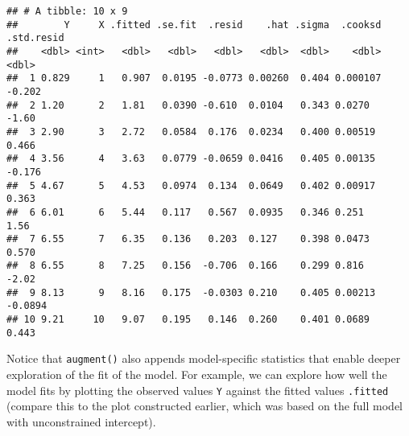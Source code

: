 \documentclass[
]{book}
\newenvironment{Shaded}{\begin{snugshade}}{\end{snugshade}}
\newcommand{\DataTypeTok}[1]{\textcolor[rgb]{0.13,0.29,0.53}{#1}}
\newcommand{\FloatTok}[1]{\textcolor[rgb]{0.00,0.00,0.81}{#1}}
\newcommand{\KeywordTok}[1]{\textcolor[rgb]{0.13,0.29,0.53}{\textbf{#1}}}
\newcommand{\NormalTok}[1]{#1}
\newcommand{\OperatorTok}[1]{\textcolor[rgb]{0.81,0.36,0.00}{\textbf{#1}}}
\newcommand{\StringTok}[1]{\textcolor[rgb]{0.31,0.60,0.02}{#1}}
\begin{document}
\begin{verbatim}
## # A tibble: 10 x 9
##        Y     X .fitted .se.fit  .resid    .hat .sigma  .cooksd .std.resid
##    <dbl> <int>   <dbl>   <dbl>   <dbl>   <dbl>  <dbl>    <dbl>      <dbl>
##  1 0.829     1   0.907  0.0195 -0.0773 0.00260  0.404 0.000107    -0.202 
##  2 1.20      2   1.81   0.0390 -0.610  0.0104   0.343 0.0270      -1.60  
##  3 2.90      3   2.72   0.0584  0.176  0.0234   0.400 0.00519      0.466 
##  4 3.56      4   3.63   0.0779 -0.0659 0.0416   0.405 0.00135     -0.176 
##  5 4.67      5   4.53   0.0974  0.134  0.0649   0.402 0.00917      0.363 
##  6 6.01      6   5.44   0.117   0.567  0.0935   0.346 0.251        1.56  
##  7 6.55      7   6.35   0.136   0.203  0.127    0.398 0.0473       0.570 
##  8 6.55      8   7.25   0.156  -0.706  0.166    0.299 0.816       -2.02  
##  9 8.13      9   8.16   0.175  -0.0303 0.210    0.405 0.00213     -0.0894
## 10 9.21     10   9.07   0.195   0.146  0.260    0.401 0.0689       0.443
\end{verbatim}

Notice that \texttt{augment()} also appends model-specific statistics that enable deeper exploration of the fit of the model. For example, we can explore how well the model fits by plotting the observed values \texttt{Y} against the fitted values \texttt{.fitted} (compare this to the plot constructed earlier, which was based on the full model with unconstrained intercept).

\begin{Shaded}
\end{Shaded}
\end{document}
